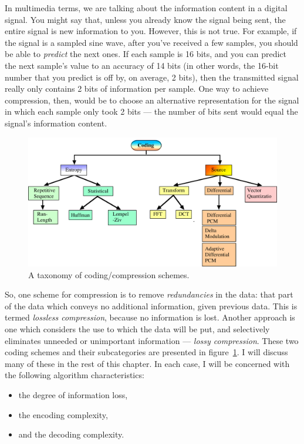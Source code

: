 \begin{window}
In multimedia terms, we are talking about the information content in a
digital signal. You might say that, unless you already know the signal
being sent, the entire signal is new information to you.  However,
this is not true. For example, if the signal is a sampled sine wave,
after you've received a few samples, you should be able to
\emph{predict} the next ones. If each sample is 16 bits, and you can
predict the next sample's value to an accuracy of 14 bits (in other
words, the 16-bit number that you predict is off by, on average, 2
bits), then the transmitted signal really only contains 2 bits of
information per sample. One way to achieve compression, then, would be
to choose an alternative representation for the signal in which each
sample only took 2 bits --- the number of bits sent would equal the
signal's information content.
\end{window}

\begin{figure}
\centerline{\includegraphics[width=\textwidth]{ch-comp/taxonomy}}
\caption{A taxonomy of coding/compression schemes.\label{fg:taxonomy}}
\end{figure}

So, one scheme for compression is to remove \emph{redundancies} in the
data: that part of the data which conveys no additional information,
given previous data. This is termed \emph{lossless compression},
because no information is lost.  Another approach is one which
considers the use to which the data will be put, and selectively
eliminates unneeded or unimportant information --- \emph{lossy
compression}. These two coding schemes and their subcategories are
presented in figure~\ref{fg:taxonomy}.  I will discuss many of these
in the rest of this chapter. In each case, I will be concerned with the
following algorithm characteristics:
\begin{itemize}
\item the degree of information loss,
\item the encoding complexity,
\item and the decoding complexity.
\end{itemize}

